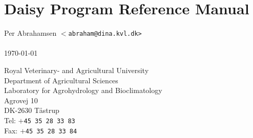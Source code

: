 
\chapter*{Daisy Program Reference Manual}

\begin{bf}
  \begin{large}
    Per Abrahamsen \texttt{$<$abraham@dina.kvl.dk>}\\
    \\
    \today{}\\
  \end{large}
\end{bf}
\vfill\noindent
Royal Veterinary- and Agricultural University\\
Department of Agricultural Sciences\\
Laboratory for Agrohydrology and Bioclimatology\\
Agrovej 10\\
DK-2630 T{\aa}strup\\
Tel: \texttt{$+$45 35 28 33 83}\\
Fax: \texttt{$+$45 35 28 33 84}


